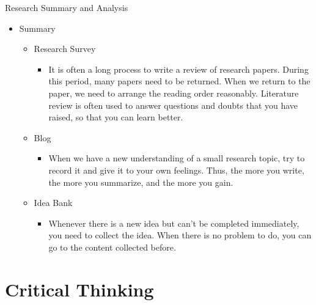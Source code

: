 \documentclass[
 size=14pt,
 paper=smartboard,  %
 mode=present, 		%
 display=slides, 	%
 style=tuliplab,  	%
 pauseslide,
 fleqn,leqno]{powerdot}{}
\begin{document}
\begin{slide}[toc=,bm=]{Research Summary and Analysis}

\begin{itemize}
  \item Summary
  \begin{itemize}
    \item Research Survey
         \begin{itemize}
           \item It is often a long process to write a review of research papers. During this period, many papers need to be returned. When we return to the paper, we need to arrange the reading order reasonably. Literature review is often used to answer questions and doubts that you have raised, so that you can learn better.
         \end{itemize}
    \item Blog
       \begin{itemize}
         \item When we have a new understanding of a small research topic, try to record it and give it to your own feelings. Thus, the more you write, the more you summarize, and the more you gain.
       \end{itemize}
    \item Idea Bank
      \begin{itemize}
        \item Whenever there is a new idea but can't be completed immediately, you need to collect the idea. When there is no problem to do, you can go to the content collected before.
      \end{itemize}
  \end{itemize}
\end{itemize}
\end{slide}

\section{Critical Thinking}
\end{document}
